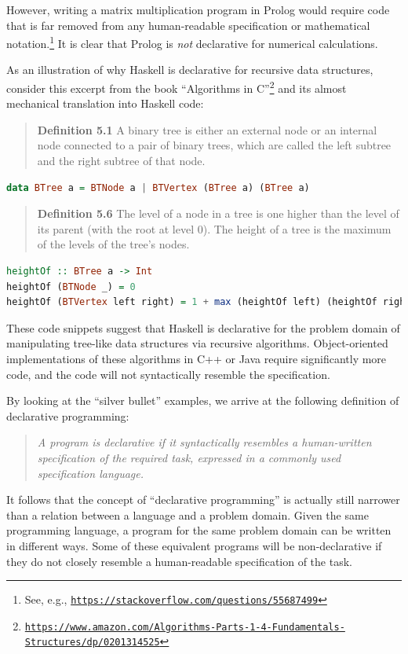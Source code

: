 However, writing a matrix multiplication program in Prolog would require
code that is far removed from any human-readable specification or
mathematical notation.\footnote{See, e.g., \texttt{\href{https://stackoverflow.com/questions/55687499}{https://stackoverflow.com/questions/55687499}}}
It is clear that Prolog is \emph{not} declarative for numerical calculations.

As an illustration of why Haskell is declarative for recursive data
structures, consider this excerpt from the book \textsf{``}Algorithms in C\textsf{''}\footnote{\texttt{\href{https://www.amazon.com/Algorithms-Parts-1-4-Fundamentals-Structures/dp/0201314525}{https://www.amazon.com/Algorithms-Parts-1-4-Fundamentals-Structures/dp/0201314525}}}
and its almost mechanical translation into Haskell code:
\begin{quotation}
\textbf{Definition 5.1} A binary tree is either an external node or
an internal node connected to a pair of binary trees, which are called
the left subtree and the right subtree of that node.
\end{quotation}
\begin{lstlisting}[language=Haskell]
data BTree a = BTNode a | BTVertex (BTree a) (BTree a)
\end{lstlisting}

\begin{quotation}
\textbf{Definition 5.6} The level of a node in a tree is one higher
than the level of its parent (with the root at level 0). The height
of a tree is the maximum of the levels of the tree\textsf{'}s nodes.
\end{quotation}
\begin{lstlisting}[language=Haskell]
heightOf :: BTree a -> Int
heightOf (BTNode _) = 0
heightOf (BTVertex left right) = 1 + max (heightOf left) (heightOf right)
\end{lstlisting}

These code snippets suggest that Haskell is declarative for the problem
domain of manipulating tree-like data structures via recursive algorithms.
Object-oriented implementations of these algorithms in C++ or Java
require significantly more code, and the code will not syntactically
resemble the specification. 

By looking at the \textsf{``}silver bullet\textsf{''} examples, we arrive at the following
definition of declarative programming:
\begin{quote}
\emph{A program is declarative if it syntactically resembles a human-written
specification of the required task, expressed in a commonly used specification
language. }
\end{quote}
It follows that the concept of \textsf{``}declarative programming\textsf{''} is actually
still narrower than a relation between a language and a problem domain.
Given the same programming language, a program for the same problem
domain can be written in different ways. Some of these equivalent
programs will be non-declarative if they do not closely resemble a
human-readable specification of the task.

